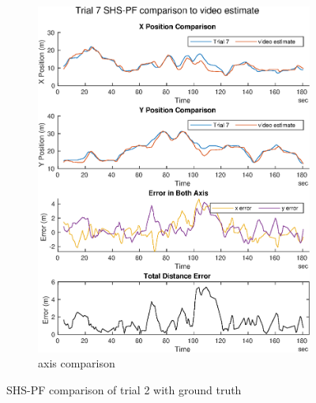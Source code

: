 \begin{figure}[H]
\begin{subfigure}[t]{.45\textwidth}
		\includegraphics[width=\linewidth]{images/20201118_1908_trial7_output_1}
		\caption{axis comparison}
		\label{fig:shspf_trial7_comparison}
	\end{subfigure}
	\caption{SHS-PF comparison of trial 2 with ground truth}
	\label{fig:shspf_trial7_shs_gt_comparison}
\end{figure}
\newpage
